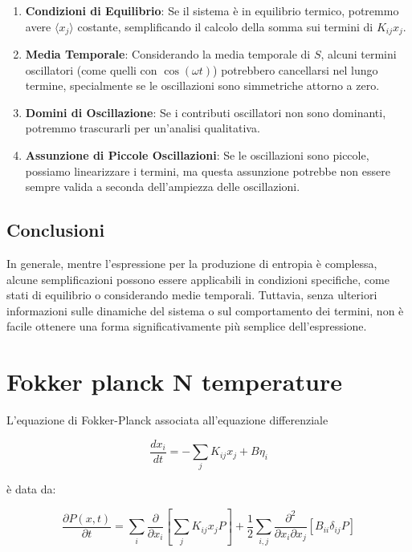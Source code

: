 \documentclass{article}
\begin{document}
\begin{enumerate}
    \item \textbf{Condizioni di Equilibrio}: Se il sistema è in equilibrio termico, potremmo avere \( \langle x_j \rangle \) costante, semplificando il calcolo della somma sui termini di \( K_{ij} x_j \).
    
    \item \textbf{Media Temporale}: Considerando la media temporale di \( S \), alcuni termini oscillatori (come quelli con \( \cos(\omega t) \)) potrebbero cancellarsi nel lungo termine, specialmente se le oscillazioni sono simmetriche attorno a zero.
    
    \item \textbf{Domini di Oscillazione}: Se i contributi oscillatori non sono dominanti, potremmo trascurarli per un'analisi qualitativa.
    
    \item \textbf{Assunzione di Piccole Oscillazioni}: Se le oscillazioni sono piccole, possiamo linearizzare i termini, ma questa assunzione potrebbe non essere sempre valida a seconda dell'ampiezza delle oscillazioni.
\end{enumerate}

\subsection*{Conclusioni}

In generale, mentre l'espressione per la produzione di entropia è complessa, alcune semplificazioni possono essere applicabili in condizioni specifiche, come stati di equilibrio o considerando medie temporali. Tuttavia, senza ulteriori informazioni sulle dinamiche del sistema o sul comportamento dei termini, non è facile ottenere una forma significativamente più semplice dell'espressione.




\section{Fokker planck N temperature}

L'equazione di Fokker-Planck associata all'equazione differenziale

\[
\frac{dx_i}{dt} = -\sum_j K_{ij} x_j + B \eta_i
\]

è data da:

\[
\frac{\partial P(x,t)}{\partial t} = \sum_i \frac{\partial}{\partial x_i} \left[ \sum_j K_{ij} x_j P \right] + \frac{1}{2} \sum_{i,j} \frac{\partial^2}{\partial x_i \partial x_j} \left[ B_{ii} \delta_{ij} P \right]
\]
\end{document}
